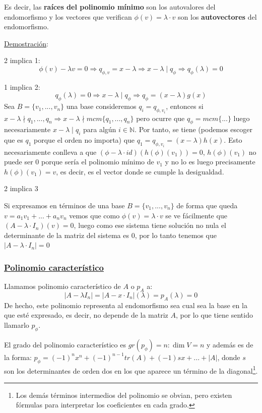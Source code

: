 \documentclass[10pt,a4paper,openright]{book}
\begin{document}
Es decir, las \textbf{raíces del polinomio mínimo} son los autovalores del endomorfismo y los vectores que verifican $\phi(v)=\lambda \cdot v$ son los \textbf{autovectores} del endomorfismo.

\underline{Demostración}:

2 implica 1:
$$\phi(v)-\lambda v =0 \Rightarrow q_{\phi,v}=x-\lambda \Rightarrow x-\lambda\mid q_\phi\Rightarrow q_\phi(\lambda)=0$$

1 implica 2:
$$q_\phi(\lambda)=0\Rightarrow x-\lambda\mid q_\phi\Rightarrow q_\phi = (x-\lambda)g(x)$$
Sea $B=\{v_1, ..., v_n\}$ una base consideremos $q_i=q_{\phi,v_i}$, entonces si $x-\lambda \nmid q_1, ..., q_n \Rightarrow x-\lambda\nmid mcm\{q_1, ..., q_n\}$ pero ocurre que $q_\phi = mcm \{...\}$ luego necesariamente $x-\lambda \mid q_i$ para algún $i \in \mathbb N$. Por tanto, se tiene (podemos escoger que es $q_1$ porque el orden no importa) que $q_1=q_{\phi,v_i} = (x-\lambda)h(x)$. Esto necesariamente conlleva a que $(\phi-\lambda\cdot id)(h(\phi)(v_1))=0$, $h(\phi)(v_1)$ no puede ser 0 porque sería el polinomio mínimo de $v_1$ y no lo es luego precisamente $h(\phi)(v_1)=v$, es decir, es el vector donde se cumple la desigualdad.   

2 implica 3

Si expresamos en términos de una base $B=\{v_1,..., v_n\}$ de forma que queda $v=a_1v_1+...+a_nv_n$ vemos que como $\phi(v)=\lambda\cdot v$ se ve fácilmente que $(A-\lambda\cdot I_n)(v)=0$, luego como ese sistema tiene solución no nula el determinante de la matriz del sistema es 0, por lo tanto tenemos que $|A-\lambda \cdot I_n|=0$

\subsubsection*{\underline{Polinomio característico}}
Llamamos polinomio característico de $A$ o $p_A$ a:
$$|A-\lambda I_n|=|A-x\cdot I_n|(\lambda)=p_A(\lambda)=0$$
De hecho, este polinomio representa al endomorfismo sea cual sea la base en la que esté expresado, es decir, no depende de la matriz $A$, por lo que tiene sentido llamarlo $p_\phi$.

El grado del polinomio característico es $gr(p_\phi)=n: \dim V=n$ y además es de la forma: $p_\phi= (-1)^nx^n+(-1)^{n-1}tr(A)+(-1)sx+...+|A|$, donde $s$ son los determinantes de orden dos en los que aparece un término de la diagonal\footnote{Los demás términos intermedios del polinomio se obvian, pero existen fórmulas para interpretar los coeficientes en cada grado.}.
\end{document}
